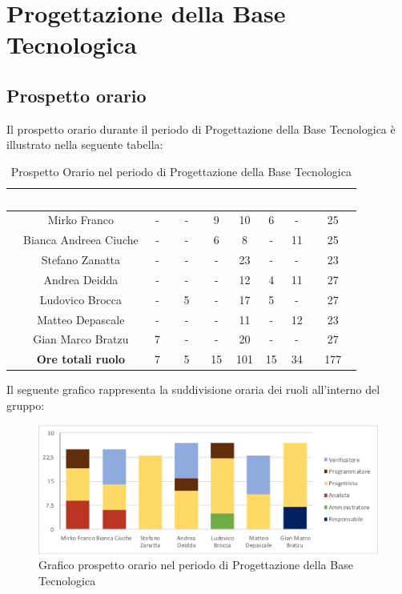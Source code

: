 \newpage
\section{Progettazione della Base Tecnologica}
\subsection{Prospetto orario}
Il prospetto orario durante il periodo di Progettazione della Base Tecnologica è illustrato nella seguente tabella:

\begin{table}[ht]
	\begin{center}
		\begin{tabular}{ccccccccc}
			\rowcolor{coolblack}
			\hline
			& \textcolor{white}{Nome} & \textcolor{white}{Re} & \textcolor{white}{Am} & \textcolor{white}{An} & \textcolor{white}{Pt} &\textcolor{white}{Pr} & \textcolor{white}{Ve} & \textcolor{white}{Totale} \\
			\hline
			&Mirko Franco & - & - & 9 & 10 & 6 & - & 25  \\
			&Bianca Andreea Ciuche & -& - & 6 & 8 & - & 11 & 25 \\
			&Stefano Zanatta &- & - & - & 23 & - & - & 23 \\
			&Andrea Deidda &  -& - & - & 12 & 4 & 11 & 27 \\
			&Ludovico Brocca & -& 5 & - & 17 & 5 & - & 27 \\
			&Matteo Depascale & -& - & - & 11 & - & 12 & 23 \\
			&Gian Marco Bratzu & 7& - & - & 20 & - & - & 27 \\
			\hline
			&\textbf{Ore totali ruolo} & 7 & 5 & 15 & 101 & 15 & 34 & 177 \\
		\end{tabular}
		\caption{Prospetto Orario nel periodo di Progettazione della Base Tecnologica}
	\end{center}
\end{table}

Il seguente grafico rappresenta la suddivisione oraria dei ruoli all'interno del gruppo:
\begin{figure}[!ht]
	\begin{center}
		\includegraphics[scale=0.85]{images/grafoProgettazioneTecnologica.png}
		\caption{Grafico prospetto orario nel periodo di Progettazione della Base Tecnologica}
	\end{center}
\end{figure}
\newpage
